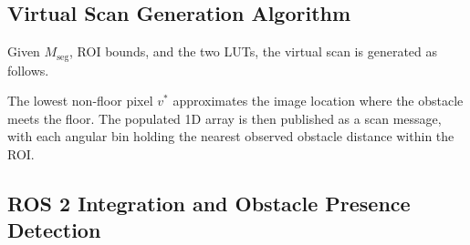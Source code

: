 \documentclass{IJCAS}
\begin{document}
\subsection{Virtual Scan Generation Algorithm}\label{sec:virtualscan}

Given $M_{\mathrm{seg}}$, ROI bounds, and the two LUTs, the virtual scan is generated as follows.

\begin{center}
\end{center}

The lowest non-floor pixel $v^*$ approximates the image location where the obstacle meets the floor. The populated 1D array is then published as a scan message, with each angular bin holding the nearest observed obstacle distance within the ROI.

\subsection{ROS 2 Integration and Obstacle Presence Detection}\label{sec:ros2int}
\end{document}
